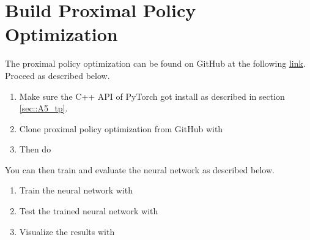 \section{Build Proximal Policy Optimization}
The proximal policy optimization can be found on GitHub at the following \href{https://github.com/mhubii/ppo_libtorch}{link}. Proceed as described below.
\begin{enumerate}
	\item Make sure the C++ API of PyTorch got install as described in section \ref{sec::A5_tp}.
	\item Clone proximal policy optimization from GitHub with
	\newline {}
	\item Then do
	\newline {}
	\newline {}
	\newline {}
\end{enumerate}
You can then train and evaluate the neural network as described below.
\begin{enumerate}
	\item Train the neural network with
	\newline {}
	\newline {}
	\item Test the trained neural network with
	\newline {}
	\newline {}
	\item Visualize the results with
	\newline {}
\end{enumerate}
